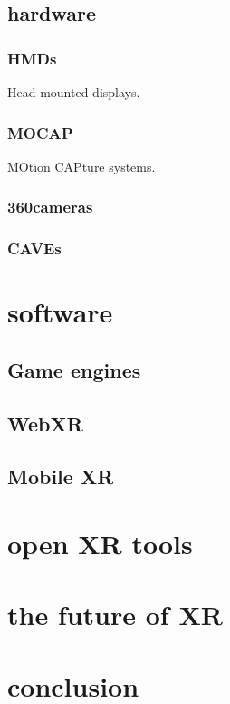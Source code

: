 \subsection{hardware}
\subsubsection{HMDs}
Head mounted displays.

\subsubsection{MOCAP}
MOtion CAPture systems. 

\subsubsection{360\textdegree cameras}

\subsubsection{CAVEs}


\section{software}
\subsection{Game engines}
\subsection{WebXR}
\subsection{Mobile XR}
\section{open XR tools }
\section{the future of XR}
\section{conclusion}



